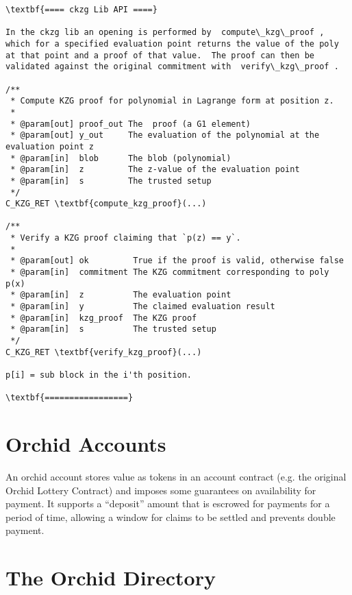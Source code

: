 \documentclass{article}
\begin{document}
\begin{verbatim}\textbf{==== ckzg Lib API ====}

In the ckzg lib an opening is performed by ⁠ compute\_kzg\_proof ⁠, which for a specified evaluation point returns the value of the poly at that point and a proof of that value.  The proof can then be validated against the original commitment with ⁠ verify\_kzg\_proof ⁠.

/**
 * Compute KZG proof for polynomial in Lagrange form at position z.
 *
 * @param[out] proof_out The  proof (a G1 element)
 * @param[out] y_out     The evaluation of the polynomial at the evaluation point z
 * @param[in]  blob      The blob (polynomial) 
 * @param[in]  z         The z-value of the evaluation point
 * @param[in]  s         The trusted setup
 */
C_KZG_RET \textbf{compute_kzg_proof}(...)

/**
 * Verify a KZG proof claiming that `p(z) == y`.
 *
 * @param[out] ok         True if the proof is valid, otherwise false
 * @param[in]  commitment The KZG commitment corresponding to poly p(x)
 * @param[in]  z          The evaluation point
 * @param[in]  y          The claimed evaluation result
 * @param[in]  kzg_proof  The KZG proof
 * @param[in]  s          The trusted setup
 */
C_KZG_RET \textbf{verify_kzg_proof}(...)

p[i] = sub block in the i'th position.

\textbf{=================}
\end{verbatim}




\section{Orchid Accounts} \label{Orchid Accounts}

An orchid account stores value as tokens in an account contract (e.g. the original Orchid Lottery Contract) and imposes some guarantees on availability for payment.  It supports a “deposit” amount that is escrowed for payments for a period of time, allowing a window for claims to be settled and prevents double payment.

\section{The Orchid Directory} \label{Orchid Directory}
\end{document}
